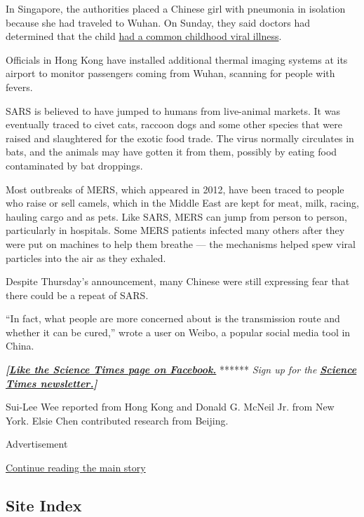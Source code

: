 In Singapore, the authorities placed a Chinese girl with pneumonia in
isolation because she had traveled to Wuhan. On Sunday, they said
doctors had determined that the child
\href{https://www.moh.gov.sg/news-highlights/details/update-on-local-situation-regarding-severe-pneumonia-cluster-in-wuhan-5-jan}{had
a common childhood viral illness}.

Officials in Hong Kong have installed additional thermal imaging systems
at its airport to monitor passengers coming from Wuhan, scanning for
people with fevers.

SARS is believed to have jumped to humans from live-animal markets. It
was eventually traced to civet cats, raccoon dogs and some other species
that were raised and slaughtered for the exotic food trade. The virus
normally circulates in bats, and the animals may have gotten it from
them, possibly by eating food contaminated by bat droppings.

Most outbreaks of MERS, which appeared in 2012, have been traced to
people who raise or sell camels, which in the Middle East are kept for
meat, milk, racing, hauling cargo and as pets. Like SARS, MERS can jump
from person to person, particularly in hospitals. Some MERS patients
infected many others after they were put on machines to help them
breathe --- the mechanisms helped spew viral particles into the air as
they exhaled.

Despite Thursday's announcement, many Chinese were still expressing fear
that there could be a repeat of SARS.

``In fact, what people are more concerned about is the transmission
route and whether it can be cured,'' wrote a user on Weibo, a popular
social media tool in China.

\textbf{\emph{{[}}\href{http://on.fb.me/1paTQ1h}{\emph{Like the Science
Times page on Facebook.}}} ****** \emph{\textbar{} Sign up for the}
\textbf{\href{http://nyti.ms/1MbHaRU}{\emph{Science Times
newsletter.}}\emph{{]}}}

Sui-Lee Wee reported from Hong Kong and Donald G. McNeil Jr. from New
York. Elsie Chen contributed research from Beijing.

Advertisement

\protect\hyperlink{after-bottom}{Continue reading the main story}

\hypertarget{site-index}{%
\subsection{Site Index}\label{site-index}}

